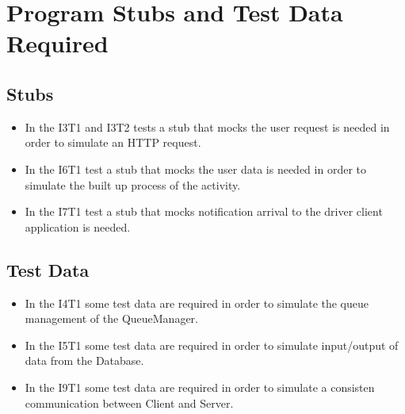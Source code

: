 \section{Program Stubs and Test Data Required} %
\label{sec:program_stubs_and_test_data_required}

\subsection{Stubs} %
\label{sub:stubs}

\begin{itemize}
	\item In the I3T1 and I3T2 tests a stub that mocks the user request is needed in order to simulate an HTTP request.
	\item In the I6T1 test a stub that mocks the user data is needed in order to simulate the built up process of the activity.
	\item In the I7T1 test a stub that mocks notification arrival to the driver client application is needed.
\end{itemize}

\subsection{Test Data} %
\label{sub:testdata}

\begin{itemize}
	\item In the I4T1 some test data are required in order to simulate the queue management of the QueueManager.
	\item In the I5T1 some test data are required in order to simulate input/output of data from the Database.
	\item In the I9T1 some test data are required in order to simulate a consisten communication between Client and Server.
\end{itemize}
